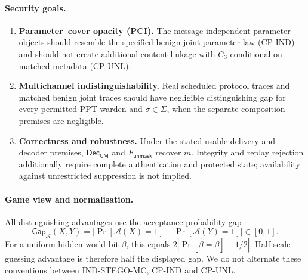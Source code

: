 \documentclass[pdflatex,sn-mathphys-num]{sn-jnl}%
\theoremstyle{definition}
\theoremstyle{game}
\theoremstyle{thmstyleone}%
\theoremstyle{thmstyletwo}%
\theoremstyle{thmstylethree}%
\begin{document}
\paragraph{Security goals.}
\begin{enumerate}[leftmargin=1.8em,label=\textbf{G\arabic*.}]
\item \textbf{Parameter--cover opacity (PCI).} The message-independent parameter
objects should resemble the specified benign joint parameter law
(\textsf{CP-IND}) and should not create additional content linkage with
$C_3$ conditional on matched metadata (\textsf{CP-UNL}).
\item \textbf{Multichannel indistinguishability.} Real scheduled protocol
traces and matched benign joint traces should have negligible distinguishing
gap for every permitted PPT warden and $\sigma\in\Sigma$, when the separate
composition premises are negligible.
\item \textbf{Correctness and robustness.} Under the stated usable-delivery
and decoder premises, $\mathsf{Dec}_{\mathsf{CM}}$ and
$F_{\mathsf{unmask}}$ recover $m$. Integrity and replay rejection additionally
require complete authentication and protected state; availability against
unrestricted suppression is not implied.
\end{enumerate}

\paragraph{Game view and normalisation.}
All distinguishing advantages use the acceptance-probability gap
\[
\mathsf{Gap}_{\mathcal A}(X,Y)
=|\Pr[\mathcal A(X)=1]-\Pr[\mathcal A(Y)=1]|\in[0,1].
\]
For a uniform hidden world bit $\beta$, this equals
$2|\Pr[\widehat\beta=\beta]-1/2|$. Half-scale guessing advantage is therefore
half the displayed gap. We do not alternate these conventions between
\textsf{IND-STEGO-MC}, \textsf{CP-IND} and \textsf{CP-UNL}.
\end{document}
